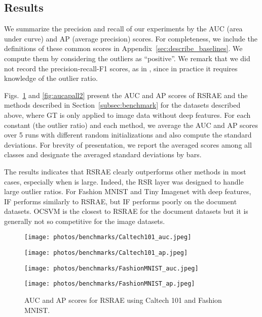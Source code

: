 \documentclass{article} \usepackage{iclr2020_conference,times}
\def\Secref#1{Section~\ref{#1}}
\begin{document}
\subsection{Results}\label{subsec:res}

We summarize the precision and recall of our experiments by the AUC (area under curve) and AP (average precision) scores. For completeness, we include the definitions of these common scores in Appendix~\ref{sec:describe_baselines}.  We
compute them by considering the outliers as ``positive''.
We remark that we did not record the precision-recall-F1 scores, as in \citet{xia2015learning,zong2018deep}, since in practice it requires knowledge of the outlier ratio.

Figs.~\ref{fig:aucapall} and \ref{fig:aucapall2} present the AUC and AP scores of RSRAE and the methods described in \Secref{subsec:benchmark} for the datasets described above, where GT is only applied to image data without deep features. For each constant  (the outlier ratio) and each method, we average the AUC and AP scores over 5 runs with different random initializations and also compute the standard deviations. For brevity of presentation, we report the averaged scores among all classes and designate the averaged standard deviations by bars. 

The results indicates that RSRAE clearly outperforms other methods in most cases, especially when  is large. Indeed, the RSR layer was designed to handle large outlier ratios. For Fashion MNIST and Tiny Imagenet with deep features, IF performs similarly to RSRAE, but IF performs poorly on the document datasets. OCSVM is the closest to RSRAE for the document datasets but it is generally not so competitive for the image datasets. 



\begin{figure}[b!]
\centering
\begin{minipage}[t]{0.48\textwidth}
\centering
\texttt{[image: photos/benchmarks/Caltech101\_auc.jpeg]}
\end{minipage}
\begin{minipage}[t]{0.48\textwidth}
\centering
\texttt{[image: photos/benchmarks/Caltech101\_ap.jpeg]}
\end{minipage}
 
\centering
\begin{minipage}[t]{0.48\textwidth}
\centering
\texttt{[image: photos/benchmarks/FashionMNIST\_auc.jpeg]}
 
\end{minipage}
\begin{minipage}[t]{0.48\textwidth}
\centering
\texttt{[image: photos/benchmarks/FashionMNIST\_ap.jpeg]}
 
\end{minipage}

\caption{AUC and AP scores for RSRAE using Caltech 101 and Fashion MNIST.}
\label{fig:aucapall}

\end{figure}
\end{document}
